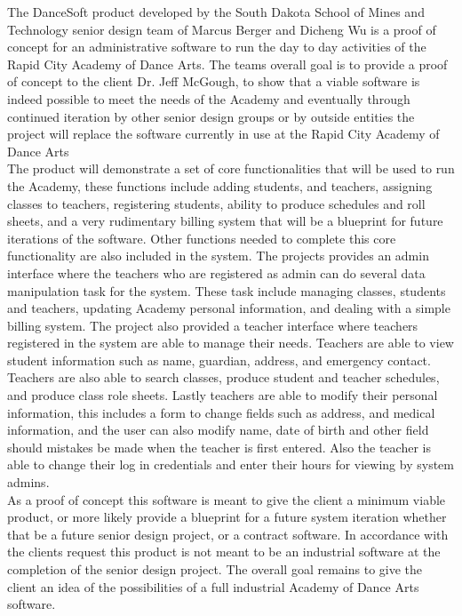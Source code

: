
	The DanceSoft product developed by the South Dakota School of Mines and Technology senior design team of Marcus Berger and Dicheng Wu is a proof of concept for an administrative software to run the day to day activities of the Rapid City Academy of Dance Arts. The teams overall goal is to provide a proof of concept to the client Dr. Jeff McGough, to show that a viable software is indeed possible to meet the needs of the Academy and eventually through continued iteration by other senior design groups or by outside entities the project will replace the software currently in use at the Rapid City Academy of Dance Arts\\
	
	The product will demonstrate a set of core functionalities that will be used to run the Academy, these functions include adding students, and teachers, assigning classes to teachers, registering students, ability to produce schedules and roll sheets, and a very rudimentary billing system that will be a blueprint for future iterations of the software.  Other functions needed to complete this core functionality are also included in the system. 
The projects provides an admin interface where the teachers who are registered as admin can do several data manipulation task for the system. These task include managing classes, students and teachers, updating Academy personal information, and dealing with a simple billing system. The project also provided a teacher interface where teachers registered in the system are able to manage their needs. Teachers are able to view student information such as name, guardian, address, and emergency contact. Teachers are also able to search classes, produce student and teacher schedules, and produce class role sheets. Lastly teachers are able to modify their personal information, this includes a form to change fields such as address, and medical information, and the user can also modify name, date of birth and other field should mistakes be made when the teacher is first entered. Also the teacher is able to change their log in credentials and enter their hours for viewing by system admins.\\

	As a proof of concept this software is meant to give the client a minimum viable product, or more likely provide a blueprint for a future system iteration whether that be a future senior design project, or a contract software. In accordance with the clients request this product is not meant to be an industrial software at the completion of the senior design project. The overall goal remains to give the client an idea of the possibilities of a full industrial Academy of Dance Arts software.


\vspace{2\baselineskip}

